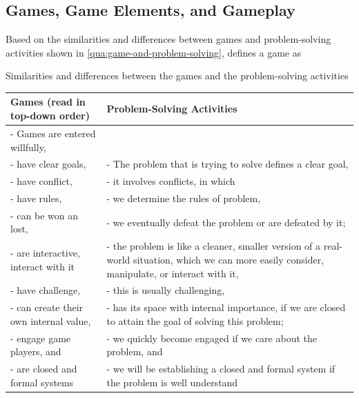 


\subsection{Games, Game Elements, and Gameplay}

Based on the similarities and differences between games and problem-solving activities shown in \autoref{qua:game-and-problem-solving},  defines a game as   

\begin{quadro}[htb]
\caption{Similarities and differences between the games and the problem-solving activities}
\label{qua:game-and-problem-solving}
\centering
\small
\begin{tabular}{m{5.5cm}|m{9.5cm}}
\textbf{Games} (read in top-down order) & \textbf{Problem-Solving Activities} \\ \hline \hline
- Games are entered willfully, &  \\
- have clear goals,  & - The problem that is trying to solve defines a clear goal, \\
- have conflict, & - it involves conflicts, in which \\
- have rules, & - we determine the rules of problem, \\
- can be won an lost, & - we eventually defeat the problem or are defeated by it; \\
- are interactive, interact with it & - the problem is like a cleaner, smaller version of a real-world situation, which we can more easily consider, manipulate, or interact with it, \\
- have challenge, & - this is usually challenging, \\
- can create their own internal value, & - has its space with internal importance, if we are closed to attain the goal of solving this problem; \\
- engage game players, and & - we quickly become engaged if we care about the problem, and \\
- are closed and formal systems & - we will be establishing a closed and formal system if the problem is well understand \\
\end{tabular}
\end{quadro}

